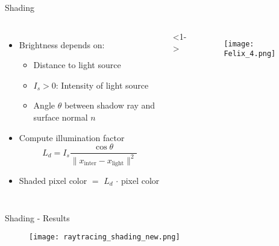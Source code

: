 \begin{frame}{Shading}
    \begin{columns}
        \begin{itemize}
        \item<1-> Brightness depends on: 
        \begin{itemize}
            \item Distance to light source
            \item $I_s > 0$: Intensity of light source
            \item Angle $\theta$ between shadow ray and surface normal $n$
        \end{itemize}
        \item<2-> Compute illumination factor
        $$
        L_d = I_s \frac{\cos \theta}{\|x_{\text{inter}} - x_{\text{light}}\|^2}
        $$
        \item<3-> Shaded pixel color $=$ $L_d$ $\cdot$ pixel color
        \end{itemize}
        <1->
        \begin{figure}
                \centering
                \texttt{[image: Felix\_4.png]}
            \end{figure}
    \end{columns}
\end{frame}

\begin{frame}{Shading - Results}
    \begin{figure}
                \centering
                \texttt{[image: raytracing\_shading\_new.png]}
            \end{figure}
\end{frame}


